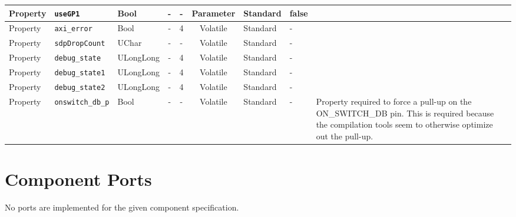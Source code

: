 \documentclass{article}
\begin{document}
\begin{landscape}
\begin{scriptsize}
\begin{tabular}{|p{1.5cm}|p{2.5cm}|p{1.5cm}|c|c|c|p{2cm}|p{1.1cm}|p{4cm}|}
			Property     & \verb+useGP1+         & Bool   & -             & -               & Parameter           & Standard    & false   &                              \\
			\hline
			Property     & \verb+axi_error+      & Bool   & -             & 4               & Volatile            & Standard    & -       &                              \\
			\hline
			Property     & \verb+sdpDropCount+   & UChar  & -             & -               & Volatile            & Standard    & -       &                              \\
			\hline
			Property     & \verb+debug_state+    & ULongLong & -          & 4               & Volatile            & Standard    & -       &                              \\
			\hline
			Property     & \verb+debug_state1+   & ULongLong & -          & 4               & Volatile            & Standard    & -       &                              \\
			\hline
			Property     & \verb+debug_state2+   & ULongLong & -          & 4               & Volatile            & Standard    & -       &                              \\
			\hline
			Property     & \verb+onswitch_db_p+  & Bool  & -              & -               & Volatile            & Standard    & -       & Property required to force a pull-up on the ON\_SWITCH\_DB pin. This is required because the compilation tools seem to otherwise optimize out the pull-up.\\
			\hline
		\end{tabular}
	\end{scriptsize}

	\section*{Component Ports}
	No ports are implemented for the given component specification.


\end{landscape}
\end{document}
